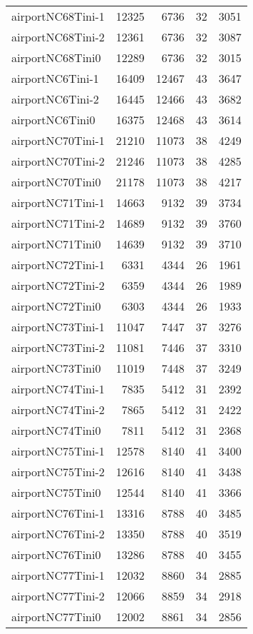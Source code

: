 \begin{tabular}{lrrrr}
airportNC68Tini-1 & 12325 & 6736 & 32 & 3051 \\
airportNC68Tini-2 & 12361 & 6736 & 32 & 3087 \\
airportNC68Tini0 & 12289 & 6736 & 32 & 3015 \\
airportNC6Tini-1 & 16409 & 12467 & 43 & 3647 \\
airportNC6Tini-2 & 16445 & 12466 & 43 & 3682 \\
airportNC6Tini0 & 16375 & 12468 & 43 & 3614 \\
airportNC70Tini-1 & 21210 & 11073 & 38 & 4249 \\
airportNC70Tini-2 & 21246 & 11073 & 38 & 4285 \\
airportNC70Tini0 & 21178 & 11073 & 38 & 4217 \\
airportNC71Tini-1 & 14663 & 9132 & 39 & 3734 \\
airportNC71Tini-2 & 14689 & 9132 & 39 & 3760 \\
airportNC71Tini0 & 14639 & 9132 & 39 & 3710 \\
airportNC72Tini-1 & 6331 & 4344 & 26 & 1961 \\
airportNC72Tini-2 & 6359 & 4344 & 26 & 1989 \\
airportNC72Tini0 & 6303 & 4344 & 26 & 1933 \\
airportNC73Tini-1 & 11047 & 7447 & 37 & 3276 \\
airportNC73Tini-2 & 11081 & 7446 & 37 & 3310 \\
airportNC73Tini0 & 11019 & 7448 & 37 & 3249 \\
airportNC74Tini-1 & 7835 & 5412 & 31 & 2392 \\
airportNC74Tini-2 & 7865 & 5412 & 31 & 2422 \\
airportNC74Tini0 & 7811 & 5412 & 31 & 2368 \\
airportNC75Tini-1 & 12578 & 8140 & 41 & 3400 \\
airportNC75Tini-2 & 12616 & 8140 & 41 & 3438 \\
airportNC75Tini0 & 12544 & 8140 & 41 & 3366 \\
airportNC76Tini-1 & 13316 & 8788 & 40 & 3485 \\
airportNC76Tini-2 & 13350 & 8788 & 40 & 3519 \\
airportNC76Tini0 & 13286 & 8788 & 40 & 3455 \\
airportNC77Tini-1 & 12032 & 8860 & 34 & 2885 \\
airportNC77Tini-2 & 12066 & 8859 & 34 & 2918 \\
airportNC77Tini0 & 12002 & 8861 & 34 & 2856 \\

\end{tabular}
